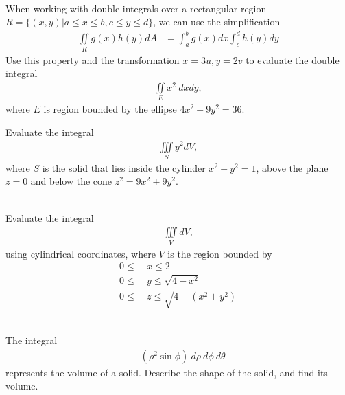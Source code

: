 \item %
 \\
When working with double integrals over a rectangular region $R=\{(x,y) | a \le x \le b, c\le y \le d\}$, we can use the simplification
\begin{align*}
   \iint\limits_{R} g(x) h(y) dA 
  & = \int_a^b g(x) dx \int_c^d h(y) dy  
\end{align*}
Use this property and the transformation $x = 3u, y = 2v$ to evaluate the double integral
\begin{align*}
  \iint\limits_E x^2 \ dxdy,
\end{align*}
where $E$ is region bounded by the ellipse $4x^2 + 9y^2 = 36$. 
\item %
Evaluate the integral
\begin{align*}
  \iiint\limits_S y^2dV,
\end{align*}
where $S$ is the solid that lies inside the cylinder $x^2+y^2 = 1$, above the plane $z=0$ and below the cone $z^2 = 9x^2 + 9y^2$. 
\item %
 \\
Evaluate the integral
\begin{align*}
  \iiint\limits_V dV,
\end{align*}
using cylindrical coordinates, where $V$ is the region bounded by
\begin{align*}
  0 \le\ &x \le 2 \\
  0 \le\ &y \le \sqrt{4 - x^2}\\
  0 \le\ &z \le \sqrt{4 - (x^2+ y^2)}
\end{align*} 
\item %
 \\
The integral
\begin{align*}
  \mathop{\int_0^{\pi/4} \!\! \int_{0}^{\pi/2} \!\! \int_0^1 } ( \rho^2 \sin\phi ) \ d\rho\  d\phi\  d\theta
\end{align*}
represents the volume of a solid. Describe the shape of the solid, and find its volume. \\
\EEN %
